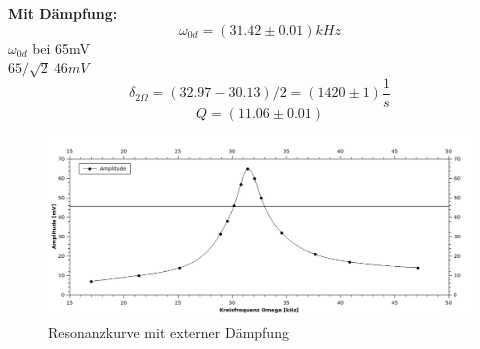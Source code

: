 \documentclass[12pt,a4paper]{article}
\begin{document}
\begin{multicols}{2}


\textbf{Mit Dämpfung:}\\
$$\omega_{0d} = (31.42 \pm 0.01) kHz$$
$\omega_{0d}$ bei 65mV\\
$65 / \sqrt{2} ~ 46mV$\\
$$\delta_{2 \Omega} = (32.97 - 30.13)/2 = (1420 \pm 1)  \frac{1}{s}$$
$$Q = (11.06 \pm 0.01)$$

\end{multicols}
\begin{figure}[H]
	\centering
	\includegraphics[scale=1.2]{./figure/resonanz_mit_ext_daempf.png}
	\caption{Resonanzkurve mit externer Dämpfung}
	\label{fig:resonanz_mit}
\end{figure}
\end{document}
